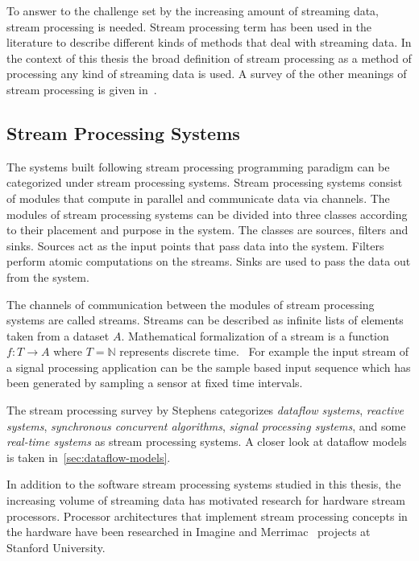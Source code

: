 To answer to the challenge set by the increasing amount of streaming data, stream processing is needed. Stream processing term has been used in the literature to describe different kinds of methods that deal with streaming data. In the context of this thesis the broad definition of stream processing as a method of processing any kind of streaming data is used. A survey of the other meanings of stream processing is given in~\cite{stephens1997survey}.

\subsection{Stream Processing Systems}
\label{subsec:stream-processing-systems}
The systems built following stream processing programming paradigm can be categorized under stream processing systems. Stream processing systems consist of modules that compute in parallel and communicate data via channels. The modules of stream processing systems can be divided into three classes according to their placement and purpose in the system. The classes are sources, filters and sinks. Sources act as the input points that pass data into the system. Filters perform atomic computations on the streams. Sinks are used to pass the data out from the system.~\cite{stephens1997survey}

The channels of communication between the modules of stream processing systems are called streams. Streams can be described as infinite lists of elements taken from a dataset $A$. Mathematical formalization of a stream is a function $f:T \rightarrow A$ where $T = \mathbb{N}$ represents discrete time.~\cite{stephens1997survey} For example the input stream of a signal processing application can be the sample based input sequence which has been generated by sampling a sensor at fixed time intervals.

The stream processing survey by Stephens \cite{stephens1997survey} categorizes \textit{dataflow systems}, \textit{reactive systems}, \textit{synchronous concurrent algorithms}, \textit{signal processing systems}, and some \textit{real-time systems} as stream processing systems. A closer look at dataflow models is taken in~\ref{sec:dataflow-models}.

In addition to the software stream processing systems studied in this thesis, the increasing volume of streaming data has motivated research for hardware stream processors. Processor architectures that implement stream processing concepts in the hardware have been researched in Imagine \cite{kapasi2002imagine} and Merrimac~\cite{dally2003merrimac} projects at Stanford University.

